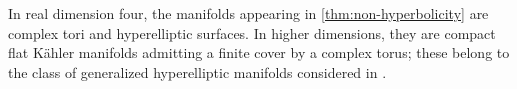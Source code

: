 \documentclass[11pt,twoside]{amsart}
\DeclareMathOperator{\Ric}{Ric}
\begin{document}
\begin{remark}
   In real dimension four, the manifolds appearing in
\autoref{thm:non-hyperbolicity} are complex tori and hyperelliptic surfaces. In higher dimensions, they are compact flat K\"ahler manifolds admitting a finite cover by a complex torus; these belong to the class of generalized hyperelliptic manifolds considered in \cite{Catanesehyperelliptic}.
\end{remark}














\end{document}
